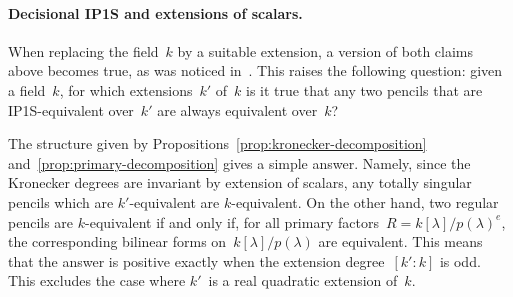 \documentclass{lms}
\begin{document}
% 

\paragraph{Decisional IP1S and extensions of scalars.}

When replacing the field~$k$ by a suitable extension,
a version of both claims above becomes true,
as was noticed in~\cite[6.1]{2013bfp}.
This raises the following question: given a field~$k$,
for which extensions~$k'$ of~$k$ is it true that
any two pencils that are IP1S-equivalent over~$k'$
are always equivalent over~$k$?

The structure given by Propositions~\ref{prop:kronecker-decomposition}
and~\ref{prop:primary-decomposition} gives a simple answer.
Namely, since the Kronecker degrees are invariant by extension of scalars,
any totally singular pencils which are $k'$-equivalent are $k$-equivalent.
On the other hand, two regular pencils are $k$-equivalent
if and only if, for all primary factors~$R =k[λ]/p(λ)^e$,
the corresponding bilinear forms on~$k[λ]/p(λ)$ are equivalent.
This means that the answer is positive exactly when
the extension degree~$[k':k]$ is odd.
This excludes the case where $k'$~is a
real quadratic extension of~$k$.

\end{document}
